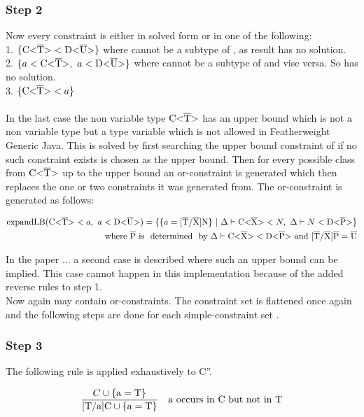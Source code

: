\subsubsection{Step 2}
Now every constraint is either in solved form or in one of the following: \\
1. $\{ \text{C<}\overline{\text{T}}\text{>} < \text{D<}\overline{\text{U}}\text{>} \}$ where  cannot be a subtype of , as result  has no solution.\\
2. $\{ a < \text{C<}\overline{\text{T}}\text{>}, \ a < \text{D<}\overline{\text{U}}\text{>} \}$ where  cannot be a subtype of  and vise versa. So  has no solution.\\
3. $\{ \text{C<}\overline{\text{T}}\text{>} < a \}$\\
\\
In the last case the non variable type $\text{C<}\overline{\text{T}}\text{>}$ has an upper bound which is not a non variable type but a type variable which is not allowed in Featherweight Generic Java.
This is solved by first searching the upper bound constraint of  if no such constraint exists  is chosen as the upper bound. Then for every possible class
from $\text{C<}\overline{\text{T}}\text{>}$ up to the upper bound an or-constraint is generated which then replaces the one or two constraints it was generated from.
The or-constraint is generated as follows:

\begin{align*}
    \text{expandLB} ( \text{C<}\overline{\text{T}}\text{>} < a, \ a < \text{D<}\overline{\text{U}}\text{>} ) = \{ \{ a = \text{[}\overline{\text{T}}/\overline{\text{X}}\text{]N} \} \ | \ \Delta \vdash \text{C<}\overline{\text{X}}\text{>} < N, \ \Delta \vdash N < \text{D<}\overline{\text{P}}\text{>} \}\\
    \text{where} \ \overline{\text{P}} \ \text{is \ determined \ by } \Delta \vdash \text{C<}\overline{\text{X}}\text{>} < \text{D<}\overline{\text{P}}\text{>} \ \text{and} \ \text{[}\overline{\text{T}}/\overline{\text{X}}\text{]}\overline{\text{P}} = \overline{\text{U}}\\
\end{align*}

In the paper ...  a second case is described where such an upper bound can be implied. This case cannot happen in this implementation because of the added reverse rules to step 1.\\
Now  again may contain or-constraints. The constraint set  is flattened once again and the following steps are done for each simple-constraint set .

\subsubsection{Step 3}
The following rule is applied exhaustively to C''.

\begin{align*}
    \frac{C \cup \{ \text{a} = \text{T} \}}{ \text{[T/a]C} \cup \{ \text{a} = \text{T} \} } \quad \text{a occurs in C but not in T}
\end{align*}

